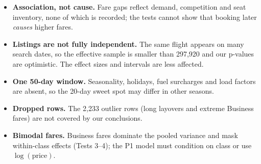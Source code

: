 \documentclass[10pt,a4paper,twocolumn]{article}
\begin{document}
\begin{itemize}
  \item \textbf{Association, not cause.} Fare gaps reflect demand, competition and seat
  inventory, none of which is recorded; the tests cannot show that booking later \emph{causes}
  higher fares.
  \item \textbf{Listings are not fully independent.} The same flight appears on many search
  dates, so the effective sample is smaller than 297,920 and our p-values are optimistic. The
  effect sizes and intervals are less affected.
  \item \textbf{One 50-day window.} Seasonality, holidays, fuel surcharges and load factors are
  absent, so the 20-day sweet spot may differ in other seasons.
  \item \textbf{Dropped rows.} The 2,233 outlier rows (long layovers and extreme Business fares)
  are not covered by our conclusions.
  \item \textbf{Bimodal fares.} Business fares dominate the pooled variance and mask
  within-class effects (Tests 3--4); the P1 model must condition on class or use
  $\log(\text{price})$.
\end{itemize}
\end{document}
